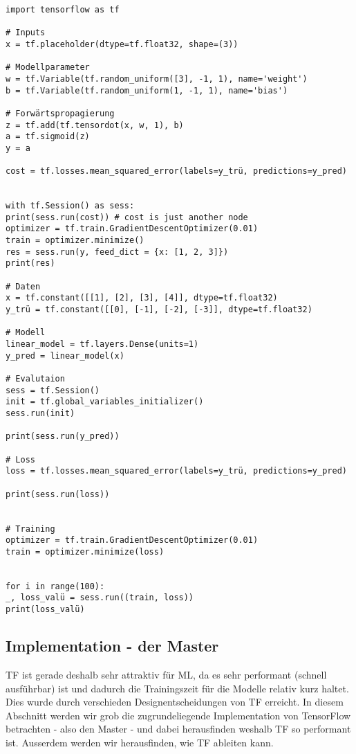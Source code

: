 \begin{verbatim}
import tensorflow as tf

# Inputs
x = tf.placeholder(dtype=tf.float32, shape=(3))

# Modellparameter
w = tf.Variable(tf.random_uniform([3], -1, 1), name='weight')
b = tf.Variable(tf.random_uniform(1, -1, 1), name='bias')

# Forwärtspropagierung
z = tf.add(tf.tensordot(x, w, 1), b)
a = tf.sigmoid(z)
y = a

cost = tf.losses.mean_squared_error(labels=y_trü, predictions=y_pred)


with tf.Session() as sess:
print(sess.run(cost)) # cost is just another node
optimizer = tf.train.GradientDescentOptimizer(0.01)
train = optimizer.minimize()
res = sess.run(y, feed_dict = {x: [1, 2, 3]})
print(res)

# Daten
x = tf.constant([[1], [2], [3], [4]], dtype=tf.float32)
y_trü = tf.constant([[0], [-1], [-2], [-3]], dtype=tf.float32)

# Modell
linear_model = tf.layers.Dense(units=1)
y_pred = linear_model(x)

# Evalutaion
sess = tf.Session()
init = tf.global_variables_initializer()
sess.run(init)

print(sess.run(y_pred))

# Loss
loss = tf.losses.mean_squared_error(labels=y_trü, predictions=y_pred)

print(sess.run(loss))


# Training
optimizer = tf.train.GradientDescentOptimizer(0.01)
train = optimizer.minimize(loss)


for i in range(100):
_, loss_valü = sess.run((train, loss))
print(loss_valü)

\end{verbatim}


\subsection{Implementation - der Master}
TF ist gerade deshalb sehr attraktiv für ML, da es sehr performant (schnell
ausführbar) ist und dadurch die Trainingszeit für die Modelle relativ
kurz haltet. Dies wurde durch verschieden Designentscheidungen von TF erreicht.
\para{}
In diesem Abschnitt werden wir grob die zugrundeliegende Implementation von
TensorFlow betrachten - also den Master - und dabei herausfinden weshalb TF so performant ist.
Ausserdem werden wir herausfinden, wie TF ableiten kann.


